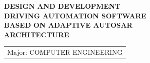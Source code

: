 \documentclass[a4paper, 12pt]{report}
\theoremstyle{definition}
\begin{document}
\begin{titlepage}
\vspace{0.2cm}

\begin{center}
\textbf{\fontsize{20pt}{20pt}\selectfont 
DESIGN AND DEVELOPMENT\\
DRIVING AUTOMATION SOFTWARE\\
BASED ON ADAPTIVE AUTOSAR\\
ARCHITECTURE\\}
\end{center}

\vspace{0.3cm}

\begin{center}
\begin{tabular}{l}
{\fontsize{15pt}{18pt}\selectfont Major: COMPUTER ENGINEERING}\\
\end{tabular}
\end{center}

\vspace{0.5cm}



\end{titlepage}
\end{document}

